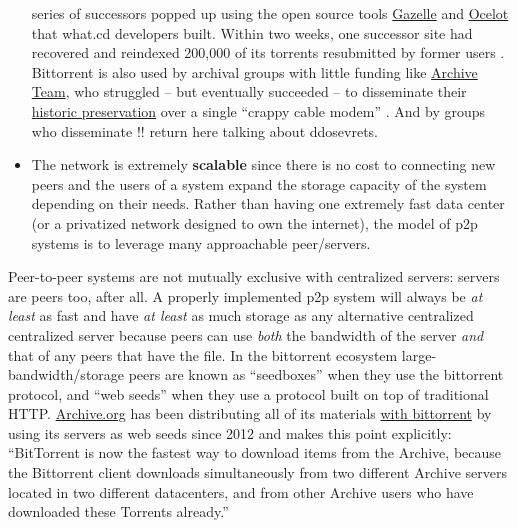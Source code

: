 \documentclass[10pt]{article}
\begin{document}
\begin{multicols}{2}
\begin{itemize}
  series of successors popped up using the open source tools
  \href{https://github.com/WhatCD/Gazelle}{Gazelle} and
  \href{https://github.com/WhatCD/Ocelot}{Ocelot} that what.cd
  developers built. Within two weeks, one successor site had recovered
  and reindexed 200,000 of its torrents resubmitted by former users \cite{vandersarWhatCdDead2016} . Bittorrent is also used by archival
  groups with little funding like
  \href{https://wiki.archiveteam.org/index.php/Main_Page}{Archive Team},
  who struggled -- but eventually succeeded -- to disseminate their
  \href{https://wiki.archiveteam.org/index.php/GeoCities_Project}{historic
  preservation} over a single ``crappy cable modem'' \cite{scottGeocitiesTorrentUpdate2010} . And by groups who disseminate !!
  return here talking about ddosevrets.
\item
  The network is extremely \textbf{scalable} since there is no cost to
  connecting new peers and the users of a system expand the storage
  capacity of the system depending on their needs. Rather than having
  one extremely fast data center (or a privatized network designed to
  own the internet), the model of p2p systems is to leverage many
  approachable peer/servers.
\end{itemize}

Peer-to-peer systems are not mutually exclusive with centralized
servers: servers are peers too, after all. A properly implemented p2p
system will always be \emph{at least} as fast and have \emph{at least}
as much storage as any alternative centralized centralized server
because peers can use \emph{both} the bandwidth of the server \emph{and}
that of any peers that have the file. In the bittorrent ecosystem
large-bandwidth/storage peers are known as ``seedboxes''\cite{rossiPeekingBitTorrentSeedbox2014}  when they use the bittorrent
protocol, and ``web seeds''\cite{hoffmanHTTPBasedSeedingSpecification}  when they use a protocol built
on top of traditional HTTP. \href{https://archive.org}{Archive.org} has
been distributing all of its materials
\href{https://archive.org/details/bittorrent}{with bittorrent} by using
its servers as web seeds since 2012 and makes this point explicitly:
``BitTorrent is now the fastest way to download items from the Archive,
because the Bittorrent client downloads simultaneously from two
different Archive servers located in two different datacenters, and from
other Archive users who have downloaded these Torrents already.'' \cite{kahle000000Torrents2012} 


\end{multicols}
\end{document}
